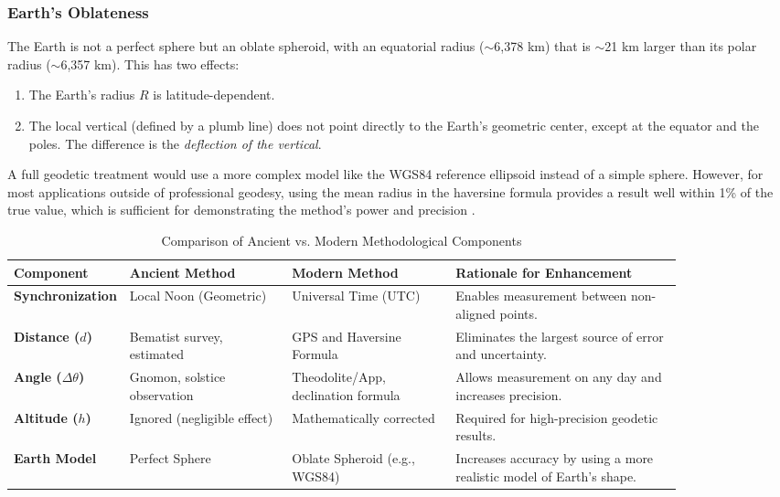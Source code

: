 \documentclass[11pt]{article}
\begin{document}
\subsubsection{Earth's Oblateness}
The Earth is not a perfect sphere but an oblate spheroid, with an equatorial radius ($\sim$6,378 km) that is $\sim$21 km larger than its polar radius ($\sim$6,357 km). This has two effects:
\begin{enumerate}
    \item The Earth's radius $R$ is latitude-dependent.
    \item The local vertical (defined by a plumb line) does not point directly to the Earth's geometric center, except at the equator and the poles. The difference is the \textit{deflection of the vertical}.
\end{enumerate}
A full geodetic treatment would use a more complex model like the WGS84 reference ellipsoid instead of a simple sphere. However, for most applications outside of professional geodesy, using the mean radius in the haversine formula provides a result well within 1\% of the true value, which is sufficient for demonstrating the method's power and precision \cite{Torge2012}.

\begin{table}[htbp]
\centering
\caption{Comparison of Ancient vs. Modern Methodological Components}
\label{tab:ancient_vs_modern}
\small
\begin{tabular}{@{}lp{0.25\linewidth}p{0.25\linewidth}p{0.35\linewidth}@{}}
\toprule
\textbf{Component} & \textbf{Ancient Method} & \textbf{Modern Method} & \textbf{Rationale for Enhancement} \\
\midrule
\textbf{Synchronization} & Local Noon (Geometric) & Universal Time (UTC) & Enables measurement between non-aligned points. \\
\addlinespace
\textbf{Distance ($d$)} & Bematist survey, estimated & GPS and Haversine Formula & Eliminates the largest source of error and uncertainty. \\
\addlinespace
\textbf{Angle ($\Delta\theta$)} & Gnomon, solstice observation & Theodolite/App, declination formula & Allows measurement on any day and increases precision. \\
\addlinespace
\textbf{Altitude ($h$)} & Ignored (negligible effect) & Mathematically corrected & Required for high-precision geodetic results. \\
\addlinespace
\textbf{Earth Model} & Perfect Sphere & Oblate Spheroid (e.g., WGS84) & Increases accuracy by using a more realistic model of Earth's shape. \\
\bottomrule
\end{tabular}
\end{table}
\end{document}
